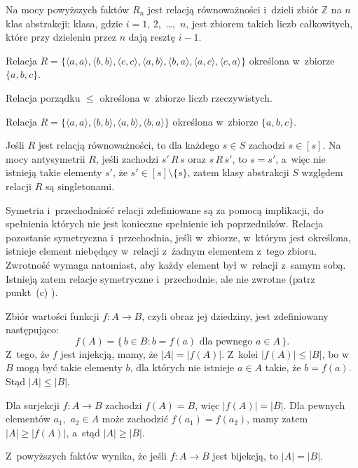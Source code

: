 Na mocy powyższych faktów $R_n$ jest relacją równoważności i~dzieli zbiór $\mathbb{Z}$ na $n$ klas abstrakcji;  klasa, gdzie $i=1$, 2,~\dots,~$n$, jest zbiorem takich liczb całkowitych, które przy dzieleniu przez $n$ dają resztę $i-1$.

\exercise %
\subexercise
Relacja $R=\bigl\{\langle a,a\rangle,\langle b,b\rangle,\langle c,c\rangle,\langle a,b\rangle,\langle b,a\rangle,\langle a,c\rangle,\langle c,a\rangle\bigr\}$ określona w~zbiorze $\{a,b,c\}$.

\subexercise
Relacja porządku $\le$ określona w~zbiorze liczb rzeczywistych.

\subexercise
Relacja $R=\bigl\{\langle a,a\rangle,\langle b,b\rangle,\langle a,b\rangle,\langle b,a\rangle\bigr\}$ określona w~zbiorze $\{a,b,c\}$.

\exercise %
Jeśli $R$ jest relacją równoważności, to dla każdego $s\in S$ zachodzi $s\in[s]$. Na mocy antysymetrii $R$, jeśli zachodzi $s'\,R\,s$ oraz $s\,R\,s'$, to $s=s'$, a~więc nie istnieją takie elementy $s'$, że $s'\in[s]\setminus\{s\}$, zatem klasy abstrakcji $S$ względem relacji $R$ są singletonami.

\exercise %
Symetria i~przechodniość relacji zdefiniowane są za pomocą implikacji, do spełnienia których nie jest konieczne spełnienie ich poprzedników. Relacja pozostanie symetryczna i~przechodnia, jeśli w~zbiorze, w~którym jest określona, istnieje element niebędący w~relacji z~żadnym elementem z~tego zbioru. Zwrotność wymaga natomiast, aby każdy element był w~relacji z~samym sobą. Istnieją zatem relacje symetryczne i~przechodnie, ale nie zwrotne (patrz punkt~(c) ).


\exercise %
\subexercise
Zbiór wartości funkcji $f\colon A\to B$, czyli obraz jej dziedziny, jest zdefiniowany następująco:
\[
	f(A) = \bigl\{\,b\in B:b=f(a)\text{ dla pewnego $a\in A$}\,\bigr\}.
\]
Z~tego, że $f$ jest injekcją, mamy, że $|A|=|f(A)|$. Z~kolei $|f(A)|\le|B|$, bo w~$B$ mogą być takie elementy $b$, dla których nie istnieje $a\in A$ takie, że $b=f(a)$. Stąd $|A|\le|B|$.

\subexercise
Dla surjekcji $f\colon A\to B$ zachodzi $f(A)=B$, więc $|f(A)|=|B|$. Dla pewnych elementów $a_1$,~$a_2\in A$ może zachodzić $f(a_1)=f(a_2)$, mamy zatem $|A|\ge|f(A)|$, a~stąd $|A|\ge|B|$.
\bigskip

Z~powyższych faktów wynika, że jeśli $f\colon A\to B$ jest bijekcją, to $|A|=|B|$.

